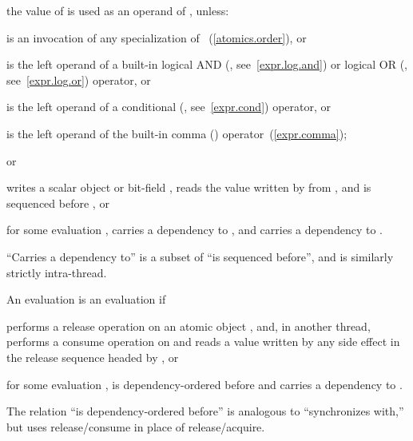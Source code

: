 \begin{compactitem}

\item
the value of  is used as an operand of , unless:
\begin{compactitem}[$\bullet$]

\item
{} is an invocation of any specialization of
~(\ref{atomics.order}), or

\item
{} is the left operand of a built-in logical AND (\tcode{\&\&},
see~\ref{expr.log.and}) or logical OR (\tcode{||}, see~\ref{expr.log.or}) 
operator, or

\item
{} is the left operand of a conditional (, see~\ref{expr.cond})
operator, or

\item
{} is the left operand of the built-in comma (\tcode{,})
operator~(\ref{expr.comma}); \end{compactitem} or

\item
{} writes a scalar object or bit-field ,  reads the value
written by  from , and  is sequenced before , or

\item
for some evaluation ,  carries a dependency to , and 
 carries a dependency to .

\end{compactitem}
%
\enternote ``Carries a dependency to'' is a subset of ``is sequenced before'',
and is similarly strictly intra-thread. \exitnote

\pnum
An evaluation  is  an evaluation
 if
\begin{compactitem}

\item
{} performs a release operation on an atomic object , and, in
another thread,  performs a consume operation on  and reads a
value written by any
%
side effect in the release sequence headed by , or

\item
for some evaluation ,  is dependency-ordered before  and
 carries a dependency to .

\end{compactitem}
%
\enternote The relation ``is dependency-ordered before'' is analogous to
``synchronizes with,'' but uses release/consume in place of release/acquire.
\exitnote

